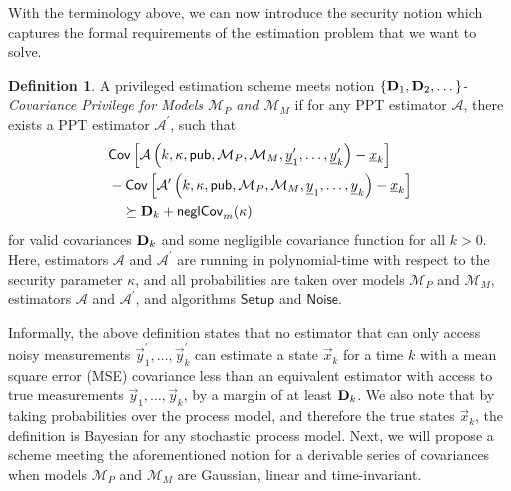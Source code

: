 \documentclass[letterpaper, 10 pt, conference]{IEEEtran}
\theoremstyle{definition}
\newtheorem{definition}{Definition}[section]
\begin{document}
With the terminology above, we can now introduce the security notion which captures the formal requirements of the estimation problem that we want to solve.
\begin{definition}\label{def:cov_privilege_security_notion}
   A privileged estimation scheme meets notion \textit{$\{{{\mathbf{D}}}_1,{{\mathbf{D}}}_2,\dots\}$-Covariance Privilege for Models $\mathcal{M}_P$ and $\mathcal{M}_M$} if for any PPT estimator $\mathcal{A}$, there exists a PPT estimator $\mathcal{A}^\prime$, such that
   \begin{equation}\label{eqn:cov_privilege}
      \begin{split}
         &\mathsf{Cov}\left[\mathcal{A}\left(k, \kappa, \mathsf{pub}, \mathcal{M}_P, \mathcal{M}_M, \vec{y}^\prime_1,\dots,\vec{y}^\prime_k\right) - \vec{x}_k \right]\\
         &-\mathsf{Cov}\left[\mathcal{A}^\prime\left(k, \kappa, \mathsf{pub}, \mathcal{M}_P, \mathcal{M}_M, \vec{y}_1,\dots,\vec{y}_k\right) - \vec{x}_k \right]\\
         &\quad\succeq \mat{D}_k + \mathsf{neglCov}_m(\kappa)
      \end{split}
   \end{equation}
   for valid covariances ${{\mathbf{D}}}_k$ and some negligible covariance function for all $k>0$. Here, estimators $\mathcal{A}$ and $\mathcal{A}^\prime$ are running in polynomial-time with respect to the security parameter $\kappa$, and all probabilities are taken over models $\mathcal{M}_P$ and $\mathcal{M}_M$, estimators $\mathcal{A}$ and $\mathcal{A}^\prime$, and algorithms $\mathsf{Setup}$ and $\mathsf{Noise}$.
\end{definition}

Informally, the above definition states that no estimator that can only access noisy measurements $\vec{y}^\prime_1,\dots,\vec{y}^\prime_k$ can estimate a state $\vec{x}_k$ for a time $k$ with a mean square error (MSE) covariance less than an equivalent estimator with access to true measurements $\vec{y}_1,\dots,\vec{y}_k$, by a margin of at least ${{\mathbf{D}}}_k$. We also note that by taking probabilities over the process model, and therefore the true states $\vec{x}_k$, the definition is Bayesian for any stochastic process model. Next, we will propose a scheme meeting the aforementioned notion for a derivable series of covariances when models $\mathcal{M}_P$ and $\mathcal{M}_M$ are Gaussian, linear and time-invariant.
\end{document}
